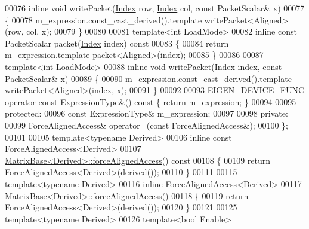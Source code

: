 \begin{DoxyCode}
00076     \textcolor{keyword}{inline} \textcolor{keywordtype}{void} writePacket(\hyperlink{namespace_eigen_a62e77e0933482dafde8fe197d9a2cfde}{Index} row, \hyperlink{namespace_eigen_a62e77e0933482dafde8fe197d9a2cfde}{Index} col, \textcolor{keyword}{const} PacketScalar& x)
00077     \{
00078       m\_expression.const\_cast\_derived().template writePacket<Aligned>(row, col, x);
00079     \}
00080 
00081     \textcolor{keyword}{template}<\textcolor{keywordtype}{int} LoadMode>
00082     \textcolor{keyword}{inline} \textcolor{keyword}{const} PacketScalar packet(\hyperlink{namespace_eigen_a62e77e0933482dafde8fe197d9a2cfde}{Index} index)\textcolor{keyword}{ const}
00083 \textcolor{keyword}{    }\{
00084       \textcolor{keywordflow}{return} m\_expression.template packet<Aligned>(index);
00085     \}
00086 
00087     \textcolor{keyword}{template}<\textcolor{keywordtype}{int} LoadMode>
00088     \textcolor{keyword}{inline} \textcolor{keywordtype}{void} writePacket(\hyperlink{namespace_eigen_a62e77e0933482dafde8fe197d9a2cfde}{Index} index, \textcolor{keyword}{const} PacketScalar& x)
00089     \{
00090       m\_expression.const\_cast\_derived().template writePacket<Aligned>(index, x);
00091     \}
00092 
00093     EIGEN\_DEVICE\_FUNC \textcolor{keyword}{operator} \textcolor{keyword}{const} ExpressionType&() \textcolor{keyword}{const} \{ \textcolor{keywordflow}{return} m\_expression; \}
00094 
00095   \textcolor{keyword}{protected}:
00096     \textcolor{keyword}{const} ExpressionType& m\_expression;
00097 
00098   \textcolor{keyword}{private}:
00099     ForceAlignedAccess& operator=(\textcolor{keyword}{const} ForceAlignedAccess&);
00100 \};
00101 
00105 \textcolor{keyword}{template}<\textcolor{keyword}{typename} Derived>
00106 \textcolor{keyword}{inline} \textcolor{keyword}{const} ForceAlignedAccess<Derived>
00107 \hyperlink{group___core___module_ad2fdb842d9a715f8778d0b33c29cfe49}{MatrixBase<Derived>::forceAlignedAccess}()\textcolor{keyword}{ const}
00108 \textcolor{keyword}{}\{
00109   \textcolor{keywordflow}{return} ForceAlignedAccess<Derived>(derived());
00110 \}
00111 
00115 \textcolor{keyword}{template}<\textcolor{keyword}{typename} Derived>
00116 \textcolor{keyword}{inline} ForceAlignedAccess<Derived>
00117 \hyperlink{group___core___module_ad2fdb842d9a715f8778d0b33c29cfe49}{MatrixBase<Derived>::forceAlignedAccess}()
00118 \{
00119   \textcolor{keywordflow}{return} ForceAlignedAccess<Derived>(derived());
00120 \}
00121 
00125 \textcolor{keyword}{template}<\textcolor{keyword}{typename} Derived>
00126 \textcolor{keyword}{template}<\textcolor{keywordtype}{bool} Enable>

\end{DoxyCode}
